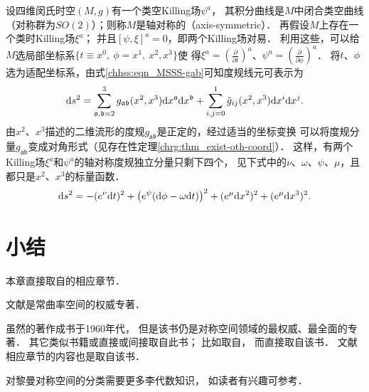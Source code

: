 设四维闵氏时空$(M,g)$有一个类空Killing场$\psi^a$，
其积分曲线是$M$中闭合类空曲线（对称群为$SO(2)$）；则称$M$是{\heiti 轴对称的}（axis-symmetric）．
再假设$M$上存在一个类时Killing场$\xi^a$；
并且$[\psi,\xi]^a=0$，即两个Killing场对易．
利用这些，可以给$M$选局部坐标系$\{t\equiv x^0,\ \phi=x^1, \  x^2, x^3\}$使
得$\xi^a=(\frac{\partial}{\partial t})^a$、$\psi^a=(\frac{\partial}{\partial \phi})^a$．
将$t$、$\phi$选为适配坐标系，由式\eqref{chhss:eqn_MSSS-gab}可知度规线元可表示为
\begin{equation*}
    \mathrm{d} s^2= \sum_{\mathfrak{a,b}=2}^{3}
    g_{\mathfrak{ab}}(x^2,x^3) \mathrm{d} x^{\mathfrak{a}} \mathrm{d} x^{\mathfrak{b}}
    +\sum_{i,j=0}^{1} \tilde{g}_{i j}(x^2,x^3) {\rm d}x^i  {\rm d}x^j.
\end{equation*}
由$x^2$、$x^3$描述的二维流形的度规$g_{\mathfrak{ab}}$是正定的，经过适当的坐标变换
可以将度规分量$g_{\mathfrak{ab}}$变成对角形式（见存在性定理\ref{chrg:thm_exist-oth-coord}）．
这样，有两个Killing场$\xi^a$和$\psi^a$的轴对称度规独立分量只剩下四个，
见下式中的$\nu$、$\omega$、$\psi$、$\mu$，且都只是$x^2$、$x^3$的标量函数．
\begin{equation}\label{chhss:eqn_AS-metric}
    \mathrm{d} s^2= - (e^{\nu}{\rm d}t)^2 
    + \bigl(e^{\psi} ({\rm d}\phi -\omega {\rm d}t )\bigr)^2
    + (e^{\mu}{\rm d}x^2)^2 +(e^{\mu}{\rm d}x^3)^2 .
\end{equation}







\section*{小结}
本章直接取自\parencite{oneill1983,weinberg_grav-1972,
    wolf_SCC-2011,chen-li-2026-2ed-v2}的相应章节．


文献\textcite{wolf_SCC-2011}是常曲率空间的权威专著．

虽然\textcite{helgason-2001}的著作成书于1960年代，
但是该书仍是{\kaishu 对称空间}领域的最权威、最全面的专著．
其它类似书籍或直接或间接取自此书；
比如\parencite[Ch.9]{chen-li-2026-2ed-v2}取自\parencite{mengdj-dckj-2005}，
而\parencite{mengdj-dckj-2005}直接取自该书．
文献\parencite{oneill1983}相应章节的内容也是取自该书．

对黎曼对称空间的分类需要更多李代数知识，
如读者有兴趣可参考\parencite{helgason-2001, mengdj-dckj-2005}．


\endinput





















